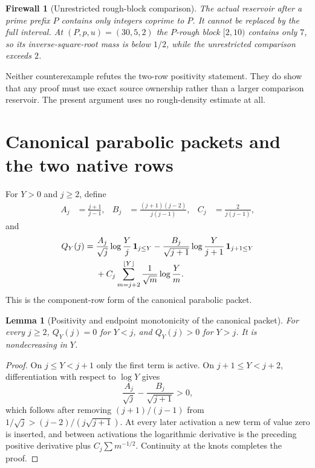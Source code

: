 \documentclass[11pt]{article}
\newtheorem{lemma}[theorem]{Lemma}
\newtheorem{warning}[theorem]{Firewall}
\newcommand{\one}{\mathbf 1}
\begin{document}
\begin{warning}[Unrestricted rough-block comparison]
The actual reservoir after a prime prefix $P$ contains only integers coprime to $P$.  It cannot be replaced by the full interval.  At $(P,p,u)=(30,5,2)$ the $P$-rough block $[2,10)$ contains only $7$, so its inverse-square-root mass is below $1/2$, while the unrestricted comparison exceeds $2$.
\end{warning}

Neither counterexample refutes the two-row positivity statement.  They do show that any proof must use exact source ownership rather than a larger comparison reservoir.  The present argument uses no rough-density estimate at all.

\section{Canonical parabolic packets and the two native rows}
\label{sec:rows}

For $Y>0$ and $j\ge2$, define
\begin{align}
 A_j&=\frac{j+1}{j-1},&
 B_j&=\frac{(j+1)(j-2)}{j(j-1)},&
 C_j&=\frac{2}{j(j-1)},\label{eq:ABC}
\end{align}
and
\begin{align}
 Q_Y(j)={}&\frac{A_j}{\sqrt j}\log\frac{Y}{j}\,\one_{j\le Y}
 -\frac{B_j}{\sqrt{j+1}}\log\frac{Y}{j+1}\,\one_{j+1\le Y}\notag\\
&+C_j\sum_{m=j+2}^{\lfloor Y\rfloor}\frac1{\sqrt m}\log\frac Ym.
\label{eq:Qrow}
\end{align}
This is the component-row form of the canonical parabolic packet.

\begin{lemma}[Positivity and endpoint monotonicity of the canonical packet]
\label{lem:Qpositive}
For every $j\ge2$, $Q_Y(j)=0$ for $Y<j$, and $Q_Y(j)>0$ for $Y>j$.  It is nondecreasing in $Y$.
\end{lemma}
\begin{proof}
On $j\le Y<j+1$ only the first term is active.  On $j+1\le Y<j+2$, differentiation with respect to $\log Y$ gives
\[
 \frac{A_j}{\sqrt j}-\frac{B_j}{\sqrt{j+1}}>0,
\]
which follows after removing $(j+1)/(j-1)$ from
$1/\sqrt j>(j-2)/(j\sqrt{j+1})$.  At every later activation a new term of value zero is inserted, and between activations the logarithmic derivative is the preceding positive derivative plus
$C_j\sum m^{-1/2}$.  Continuity at the knots completes the proof.
\end{proof}
\end{document}
